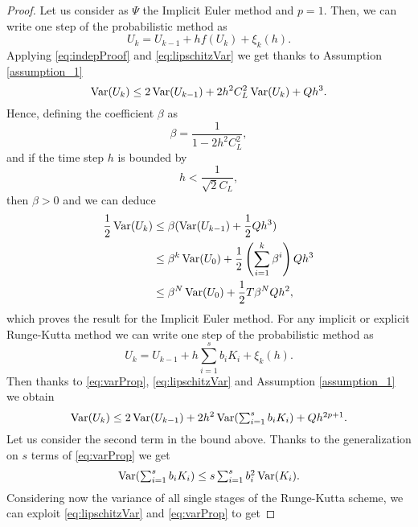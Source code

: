 \begin{proof} Let us consider as $\Psi$ the Implicit Euler method and $p = 1$. Then, we can write one step of the probabilistic method as
\begin{equation}
	U_{k} = U_{k-1} + hf(U_{k}) + \xi_k(h).
\end{equation}
Applying \eqref{eq:indepProof} and \eqref{eq:lipschitzVar} we get thanks to Assumption \ref{assumption_1}
\begin{equation}
	\operatorname{Var}(U_k) \leq 2\operatorname{Var}(U_{k-1}) + 2h^2C_L^2 \operatorname{Var}(U_k) + Q h^3.
\end{equation}
Hence, defining the coefficient $\beta$ as 
\begin{equation}
	\beta = \frac{1}{1 - 2h^2C_L^2}, 
\end{equation}
and if the time step $h$ is bounded by
\begin{equation}
	h < \frac{1}{\sqrt{2}C_L},
\end{equation}
then $\beta > 0$ and we can deduce
\begin{equation}
\begin{aligned}
	\frac{1}{2}\operatorname{Var}(U_k) &\leq \beta(\operatorname{Var}(U_{k-1}) + \frac{1}{2}Q h^3) \\
	&\leq \beta^k \operatorname{Var}(U_0) + \frac{1}{2}\left(\sum_{i = 1}^{k} \beta^i\right) Q h^3 \\
	&\leq \beta^N \operatorname{Var}(U_0) + \frac{1}{2}T \beta^N Q h^2,
\end{aligned}
\end{equation}
which proves the result for the Implicit Euler method. For any implicit or explicit Runge-Kutta method we can write one step of the probabilistic method as
\begin{equation}
U_k = U_{k-1} + h\sum_{i=1}^{s}b_iK_i + \xi_k(h).
\end{equation}
Then thanks to \eqref{eq:varProp}, \eqref{eq:lipschitzVar} and Assumption \ref{assumption_1} we obtain
\begin{equation}\label{eq:partialLemRKI}
\operatorname{Var}(U_k) \leq 2 \operatorname{Var}(U_{k-1}) + 2h^2\operatorname{Var}(\textstyle\sum_{i=1}^{s}b_i K_i) + Q h^{2p + 1}.
\end{equation}
Let us consider the second term in the bound above. Thanks to the generalization on $s$ terms of \eqref{eq:varProp} we get
\begin{equation}
\operatorname{Var}(\textstyle \sum_{i=1}^{s}b_i K_i) \leq s \sum_{i=1}^s b_i^2 \operatorname{Var}(K_i).
\end{equation}
Considering now the variance of all single stages of the Runge-Kutta scheme, we can exploit \eqref{eq:lipschitzVar} and \eqref{eq:varProp} to get

\end{proof}
